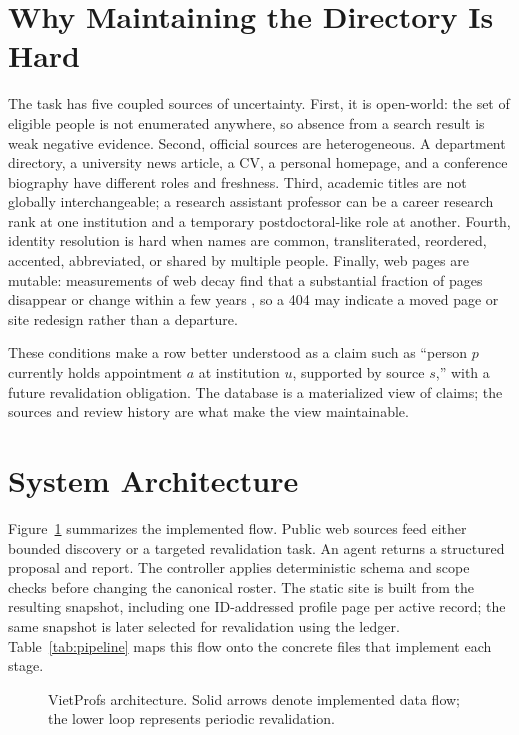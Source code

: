 \documentclass[11pt]{article}
\begin{document}
\section{Why Maintaining the Directory Is Hard}
\label{sec:hard}
The task has five coupled sources of uncertainty.
First, it is open-world: the set of eligible people is not enumerated anywhere, so absence from a search result is weak negative evidence.
Second, official sources are heterogeneous.
A department directory, a university news article, a CV, a personal homepage, and a conference biography have different roles and freshness.
Third, academic titles are not globally interchangeable; a research assistant professor can be a career research rank at one institution and a temporary postdoctoral-like role at another.
Fourth, identity resolution is hard when names are common, transliterated, reordered, accented, abbreviated, or shared by multiple people.
Finally, web pages are mutable: measurements of web decay find that a substantial fraction of pages disappear or change within a few years \cite{bar-yossef2004sic}, so a 404 may indicate a moved page or site redesign rather than a departure.

These conditions make a row better understood as a claim such as ``person $p$ currently holds appointment $a$ at institution $u$, supported by source $s$,'' with a future revalidation obligation.
The database is a materialized view of claims; the sources and review history are what make the view maintainable.

\section{System Architecture}
\label{sec:architecture}
Figure~\ref{fig:arch} summarizes the implemented flow.
Public web sources feed either bounded discovery or a targeted revalidation task.
An agent returns a structured proposal and report.
The controller applies deterministic schema and scope checks before changing the canonical roster.
The static site is built from the resulting snapshot, including one ID-addressed profile page per active record; the same snapshot is later selected for revalidation using the ledger.
Table~\ref{tab:pipeline} maps this flow onto the concrete files that implement each stage.

\begin{figure}[t]
\centering

\caption{VietProfs architecture. Solid arrows denote implemented data flow; the lower loop represents periodic revalidation.}
\label{fig:arch}
\end{figure}
\end{document}
